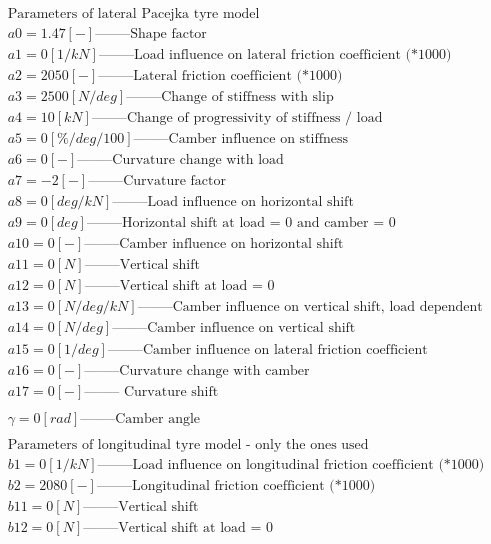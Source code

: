 \documentclass{report}
\begin{document}
\begin{equation*}
\begin{aligned}
\text{Parameters of lateral Pacejka tyre model}\\
a0 = 1.47 [-] \text{--------Shape factor}\\
a1 = 0 [1/kN] \text{--------Load influence on lateral friction coefficient (*1000)}\\
a2 = 2050 [-] \text{--------Lateral friction coefficient (*1000)}\\
a3 = 2500 [N/deg] \text{--------Change of stiffness with slip}\\
a4 = 10 [kN] \text{--------Change of progressivity of stiffness / load}\\
a5 = 0 [\%/deg/100] \text{--------Camber influence on stiffness}\\
a6 = 0 [-] \text{--------Curvature change with load}\\
a7 = -2 [-] \text{--------Curvature factor}\\
a8 = 0 [deg/kN] \text{--------Load influence on horizontal shift}\\
a9 = 0 [deg] \text{--------Horizontal shift at load = 0 and camber = 0}\\
a10 = 0 [-] \text{--------Camber influence on horizontal shift}\\
a11 = 0 [N] \text{--------Vertical shift}\\
a12 = 0 [N] \text{--------Vertical shift at load = 0}\\
a13 = 0 [N/deg/kN] \text{--------Camber influence on vertical shift, load dependent}\\
a14 = 0 [N/deg] \text{--------Camber influence on vertical shift}\\
a15 = 0 [1/deg] \text{--------Camber influence on lateral friction coefficient}\\
a16 = 0 [-] \text{--------Curvature change with camber}\\
a17 = 0 [-] \text{-------- 	Curvature shift}\\\\
\gamma = 0 [rad] \text{--------Camber angle}\\\\
\text{Parameters of longitudinal tyre model - only the ones used}\\
b1 = 0 [1/kN] \text{--------Load influence on longitudinal friction coefficient (*1000)}\\
b2 = 2080 [-] \text{--------Longitudinal friction coefficient (*1000)}\\
b11 = 0 [N] \text{--------Vertical shift}\\
b12 = 0 [N] \text{--------Vertical shift at load = 0}\\
\end{aligned}
\end{equation*}
\end{document}
